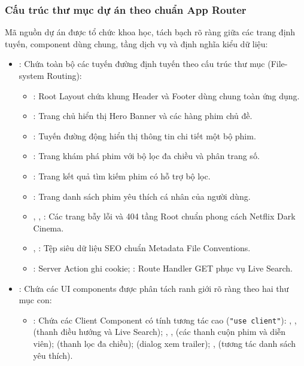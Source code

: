 \documentclass[12pt,a4paper]{extarticle}
\begin{document}
\subsubsection{Cấu trúc thư mục dự án theo chuẩn App Router}
Mã nguồn dự án được tổ chức khoa học, tách bạch rõ ràng giữa các trang định tuyến, component dùng chung, tầng dịch vụ và định nghĩa kiểu dữ liệu:
\begin{itemize}[noitemsep]
    \item {}: Chứa toàn bộ các tuyến đường định tuyến theo cấu trúc thư mục (File-system Routing):
    \begin{itemize}[noitemsep]
        \item {}: Root Layout chứa khung Header và Footer dùng chung toàn ứng dụng.
        \item {}: Trang chủ hiển thị Hero Banner và các hàng phim chủ đề.
        \item {}: Tuyến đường động hiển thị thông tin chi tiết một bộ phim.
        \item {}: Trang khám phá phim với bộ lọc đa chiều và phân trang số.
        \item {}: Trang kết quả tìm kiếm phim có hỗ trợ bộ lọc.
        \item {}: Trang danh sách phim yêu thích cá nhân của người dùng.
        \item {}, , : Các trang bẫy lỗi và 404 tầng Root chuẩn phong cách Netflix Dark Cinema.
        \item {}, : Tệp siêu dữ liệu SEO chuẩn Metadata File Conventions.
        \item {}: Server Action ghi cookie; : Route Handler GET phục vụ Live Search.
    \end{itemize}
    \item {}: Chứa các UI components được phân tách ranh giới rõ ràng theo hai thư mục con:
    \begin{itemize}[noitemsep]
        \item {}: Chứa các Client Component có tính tương tác cao (\texttt{"use client"}): , ,  (thanh điều hướng và Live Search); , ,  (các thanh cuộn phim và diễn viên);  (thanh lọc đa chiều);  (dialog xem trailer); ,  (tương tác danh sách yêu thích).

\end{itemize}
\end{itemize}
\end{document}
